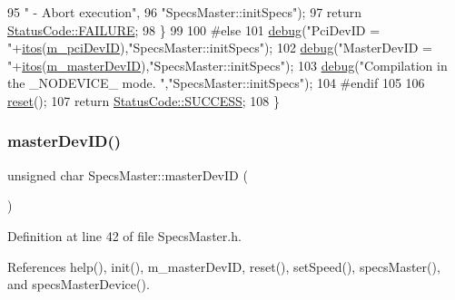 \begin{DoxyCode}
95           \textcolor{stringliteral}{" - Abort execution"},
96           \textcolor{stringliteral}{"SpecsMaster::initSpecs"});
97     \textcolor{keywordflow}{return} \hyperlink{classStatusCode_a6f565cbeadc76d14c72f047e5e85eb4ba3da73d4c469762eb9d3c960368252b26}{StatusCode::FAILURE};
98   \}
99     
100 \textcolor{preprocessor}{#else
}
101     \hyperlink{classObject_aac010553f022165573714b7014a15f0d}{debug}(\textcolor{stringliteral}{"PciDevID       = "}+\hyperlink{Tools_8h_af330027dbdafb9a30768b3613c553e60}{itos}(\hyperlink{classSpecsMaster_a1a2b2ea916633b7eaee63589946e8909}{m\_pciDevID}),\textcolor{stringliteral}{"SpecsMaster::initSpecs"});
102   \hyperlink{classObject_aac010553f022165573714b7014a15f0d}{debug}(\textcolor{stringliteral}{"MasterDevID    = "}+\hyperlink{Tools_8h_af330027dbdafb9a30768b3613c553e60}{itos}(\hyperlink{classSpecsMaster_a46913a84dbe228a115ee1b90c82e44e2}{m\_masterDevID}),\textcolor{stringliteral}{"SpecsMaster::initSpecs"});
103   \hyperlink{classObject_aac010553f022165573714b7014a15f0d}{debug}(\textcolor{stringliteral}{"Compilation in the \_NODEVICE\_ mode. "},\textcolor{stringliteral}{"SpecsMaster::initSpecs"});
104 \textcolor{preprocessor}{#endif
}
105 
106   \hyperlink{classSpecsMaster_a0cbd251edefae5f154ec21b1b944d153}{reset}();
107   \textcolor{keywordflow}{return} \hyperlink{classStatusCode_a6f565cbeadc76d14c72f047e5e85eb4badd0da38d3ba0d922efd1f4619bc37ad8}{StatusCode::SUCCESS};
108 \}
\end{DoxyCode}
\mbox{\label{classSpecsMaster_a7bbbc2994a3e17bb91a0651eaa241842}} 
\subsubsection{\texorpdfstring{master\+Dev\+I\+D()}{masterDevID()}}
{\footnotesize\ttfamily unsigned char Specs\+Master\+::master\+Dev\+ID (\begin{DoxyParamCaption}{ }\end{DoxyParamCaption})\hspace{0.3cm}{\ttfamily [inline]}}



Definition at line 42 of file Specs\+Master.\+h.



References help(), init(), m\+\_\+master\+Dev\+ID, reset(), set\+Speed(), specs\+Master(), and specs\+Master\+Device().



